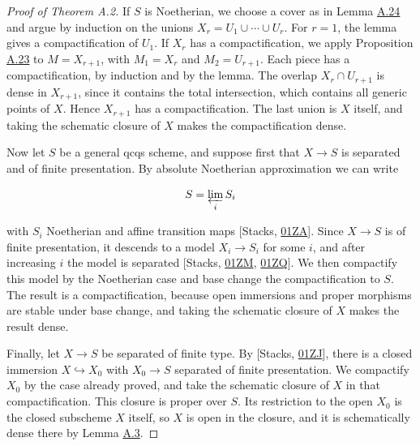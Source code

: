 \documentclass[11pt]{article}
\begin{document}
\begin{proof}[{Proof of Theorem A.2}]\label{bp70}%
If \(S\) is Noetherian, we choose a cover as in Lemma \hyperref[bp67]{A.24} and argue by induction on the unions \(X_r=U_1\cup\cdots\cup U_r\). For \(r=1\), the lemma gives a compactification of \(U_1\). If \(X_r\) has a compactification, we apply Proposition \hyperref[bp63]{A.23} to \(M=X_{r+1}\), with \(M_1=X_r\) and \(M_2=U_{r+1}\). Each piece has a compactification, by induction and by the lemma. The overlap \(X_r\cap U_{r+1}\) is dense in \(X_{r+1}\), since it contains the total intersection, which contains all generic points of \(X\). Hence \(X_{r+1}\) has a compactification. The last union is \(X\) itself, and taking the schematic closure of \(X\) makes the compactification dense.

Now let \(S\) be a general qcqs scheme, and suppose first that \(X\to S\) is separated and of finite presentation. By absolute Noetherian approximation we can write

\[
S=\varprojlim_i S_i
\]

with \(S_i\) Noetherian and affine transition maps [Stacks, \href{https://stacks.math.columbia.edu/tag/01ZA}{01ZA}]. Since \(X\to S\) is of finite presentation, it descends to a model \(X_i\to S_i\) for some \(i\), and after increasing \(i\) the model is separated [Stacks, \href{https://stacks.math.columbia.edu/tag/01ZM}{01ZM}, \href{https://stacks.math.columbia.edu/tag/01ZQ}{01ZQ}]. We then compactify this model by the Noetherian case and base change the compactification to \(S\). The result is a compactification, because open immersions and proper morphisms are stable under base change, and taking the schematic closure of \(X\) makes the result dense.

Finally, let \(X\to S\) be separated of finite type. By [Stacks, \href{https://stacks.math.columbia.edu/tag/01ZJ}{01ZJ}], there is a closed immersion \(X\hookrightarrow X_0\) with \(X_0\to S\) separated of finite presentation. We compactify \(X_0\) by the case already proved, and take the schematic closure of \(X\) in that compactification. This closure is proper over \(S\). Its restriction to the open \(X_0\) is the closed subscheme \(X\) itself, so \(X\) is open in the closure, and it is schematically dense there by Lemma \hyperref[bp11]{A.3}.
\end{proof}


\end{document}
